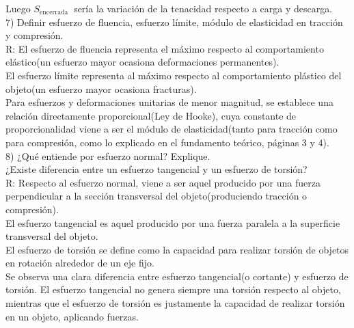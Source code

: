 Luego $S_{\text {encerrada }}$ sería la variación de la tenacidad respecto a carga y descarga.\\
7) Definir esfuerzo de fluencia, esfuerzo límite, módulo de elasticidad en tracción y compresión.\\
R: El esfuerzo de fluencia representa el máximo respecto al comportamiento elástico(un esfuerzo mayor ocasiona deformaciones permanentes).\\
El esfuerzo límite representa al máximo respecto al comportamiento plástico del objeto(un esfuerzo mayor ocasiona fracturas).\\
Para esfuerzos y deformaciones unitarias de menor magnitud, se establece una relación directamente proporcional(Ley de Hooke), cuya constante de proporcionalidad viene a ser el módulo de elasticidad(tanto para tracción como para compresión, como lo explicado en el fundamento teórico, páginas 3 y 4).\\
8) ¿Qué entiende por esfuerzo normal? Explique.\\
¿Existe diferencia entre un esfuerzo tangencial y un esfuerzo de torsión?\\
R: Respecto al esfuerzo normal, viene a ser aquel producido por una fuerza perpendicular a la sección transversal del objeto(produciendo tracción o compresión).\\
El esfuerzo tangencial es aquel producido por una fuerza paralela a la superficie transversal del objeto.\\
El esfuerzo de torsión se define como la capacidad para realizar torsión de objetos en rotación alrededor de un eje fijo.\\
Se observa una clara diferencia entre esfuerzo tangencial(o cortante) y esfuerzo de torsión. El esfuerzo tangencial no genera siempre una torsión respecto al objeto, mientras que el esfuerzo de torsión es justamente la capacidad de realizar torsión en un objeto, aplicando fuerzas.

